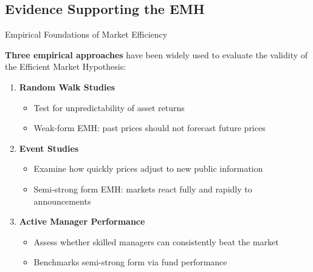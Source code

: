 \subsection{Evidence Supporting the EMH}
\begin{frame}{Empirical Foundations of Market Efficiency}
	
	\textbf{Three empirical approaches} have been widely used to evaluate the validity of the Efficient Market Hypothesis:
	
	\vspace{0.4cm}
	\begin{enumerate}
		\item \textbf{Random Walk Studies}  
		\begin{itemize}
			\item Test for unpredictability of asset returns
			\item Weak-form EMH: past prices should not forecast future prices
		\end{itemize}
		
		\item \textbf{Event Studies}  
		\begin{itemize}
			\item Examine how quickly prices adjust to new public information
			\item Semi-strong form EMH: markets react fully and rapidly to announcements
		\end{itemize}
		
		\item \textbf{Active Manager Performance}  
		\begin{itemize}
			\item Assess whether skilled managers can consistently beat the market
			\item Benchmarks semi-strong form via fund performance
		\end{itemize}
	\end{enumerate}
	
\end{frame}

